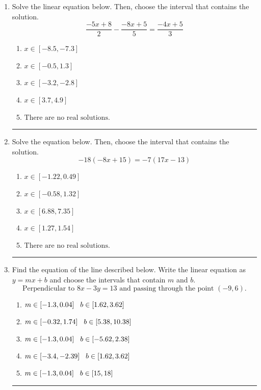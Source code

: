 \documentclass[14pt]{extbook}
\newcommand{\litem}[1]{\item#1\hspace*{-1cm}\rule{\textwidth}{0.4pt}}
\begin{document}
\begin{enumerate}
{\begin{enumerate}[label=\Alph*.]
\end{enumerate} }
\litem{
Solve the linear equation below. Then, choose the interval that contains the solution.\[ \frac{-5x + 8}{2} - \frac{-8x + 5}{5} = \frac{-4x + 5}{3} \]\begin{enumerate}[label=\Alph*.]
\item \( x \in [-8.5, -7.3] \)
\item \( x \in [-0.5, 1.3] \)
\item \( x \in [-3.2, -2.8] \)
\item \( x \in [3.7, 4.9] \)
\item \( \text{There are no real solutions.} \)

\end{enumerate} }
\litem{
Solve the equation below. Then, choose the interval that contains the solution.\[ -18(-8x + 15) = -7(17x -13) \]\begin{enumerate}[label=\Alph*.]
\item \( x \in [-1.22, 0.49] \)
\item \( x \in [-0.58, 1.32] \)
\item \( x \in [6.88, 7.35] \)
\item \( x \in [1.27, 1.54] \)
\item \( \text{There are no real solutions.} \)

\end{enumerate} }
\litem{
Find the equation of the line described below. Write the linear equation as $ y=mx+b $ and choose the intervals that contain $m$ and $b$.\[ \text{Perpendicular to } 8 x - 3 y = 13 \text{ and passing through the point } (-9, 6). \]\begin{enumerate}[label=\Alph*.]
\item \( m \in [-1.3, 0.04] \hspace*{3mm} b \in [1.62, 3.62] \)
\item \( m \in [-0.32, 1.74] \hspace*{3mm} b \in [5.38, 10.38] \)
\item \( m \in [-1.3, 0.04] \hspace*{3mm} b \in [-5.62, 2.38] \)
\item \( m \in [-3.4, -2.39] \hspace*{3mm} b \in [1.62, 3.62] \)
\item \( m \in [-1.3, 0.04] \hspace*{3mm} b \in [15, 18] \)


\end{enumerate}}
\end{enumerate}
\end{document}

